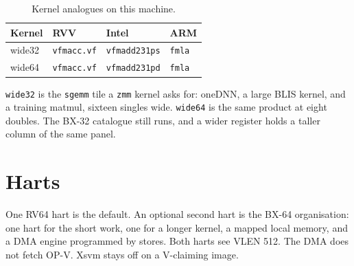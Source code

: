 \begin{table}[htbp]
\centering
\caption{Kernel analogues on this machine.}
\small
\begin{tabular}{@{}llll@{}}
\toprule
Kernel & RVV & Intel & ARM \\
\midrule
wide32 & \texttt{vfmacc.vf} & \texttt{vfmadd231ps} & \texttt{fmla} \\
wide64 & \texttt{vfmacc.vf} & \texttt{vfmadd231pd} & \texttt{fmla} \\
\bottomrule
\end{tabular}
\end{table}

\texttt{wide32} is the \texttt{sgemm} tile a \texttt{zmm} kernel asks for: oneDNN, a large BLIS kernel, and a training matmul, sixteen singles wide. \texttt{wide64} is the same product at eight doubles. The BX-32 catalogue still runs, and a wider register holds a taller column of the same panel.




\section{Harts}

One RV64 hart is the default. An optional second hart is the BX-64 organisation: one hart for the short work, one for a longer kernel, a mapped local memory, and a DMA engine programmed by stores. Both harts see VLEN 512. The DMA does not fetch OP-V. Xsvm stays off on a V-claiming image.
